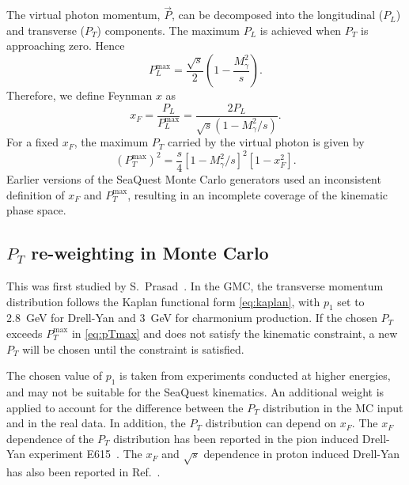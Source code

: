 \documentclass[../main.tex]{subfiles}
\begin{document}
The virtual photon momentum, $\vec{P}$, can be decomposed into the longitudinal ($P_L$) and transverse ($P_T$)
components. The maximum $P_L$ is achieved when $P_T$ is approaching zero. Hence
\begin{equation}
	P_L^{\mathrm{max}} = \frac{\sqrt{s}}{2}\left(1-\frac{M_\gamma^2}{s}\right).
\end{equation}
Therefore, we define Feynman $x$ as
\begin{equation}
	x_F = \frac{P_L}{P_L^{\mathrm{max}}}=\frac{2P_L}{\sqrt{s}\left(1-M_\gamma^2/s\right)}.
\end{equation}
For a fixed $x_F$, the maximum $P_T$ carried by the virtual photon
is given by
\begin{equation}
	\left(P_T^{\mathrm{max}}\right)^2 = \frac{s}{4} \left[1-M^2_\gamma/s\right]^2\left[1-x_F^2\right].
	\label{eq:pTmax}
\end{equation}
Earlier versions of the SeaQuest Monte Carlo generators used an inconsistent definition of $x_F$
and $P_T^{\mathrm{max}}$, resulting in an incomplete coverage of the kinematic phase space.

\subsection{\texorpdfstring{$P_T$}{P\_T} re-weighting in Monte Carlo}
\label{subsec:pt_reweight}
This was first studied by S.~Prasad~\cite{prasad2020}.
In the GMC, the transverse momentum distribution follows the Kaplan functional form
\cref{eq:kaplan},
with $p_1$ set to \SI{2.8}{\GeV} for Drell-Yan and \SI{3}{\GeV} for charmonium
production. If the chosen $P_T$ exceeds $P_T^{\mathrm{max}}$ in \cref{eq:pTmax}
and does not satisfy the kinematic constraint, a new $P_T$ will be chosen until
the constraint is satisfied.

The chosen value of $p_1$ is taken from experiments conducted at higher
energies, and may not be suitable for the SeaQuest kinematics. An additional weight is
applied to account for the difference between the $P_T$ distribution in the MC input
and in the real data. In addition, the $P_T$ distribution can depend on $x_F$.
The $x_F$ dependence of the $P_T$ distribution has been reported in the pion induced
Drell-Yan experiment E615~\cite{conway1989}. The $x_F$ and $\sqrt{s}$ dependence in
proton induced Drell-Yan has also been reported in Ref.~\cite{prasad2020}.
\end{document}
